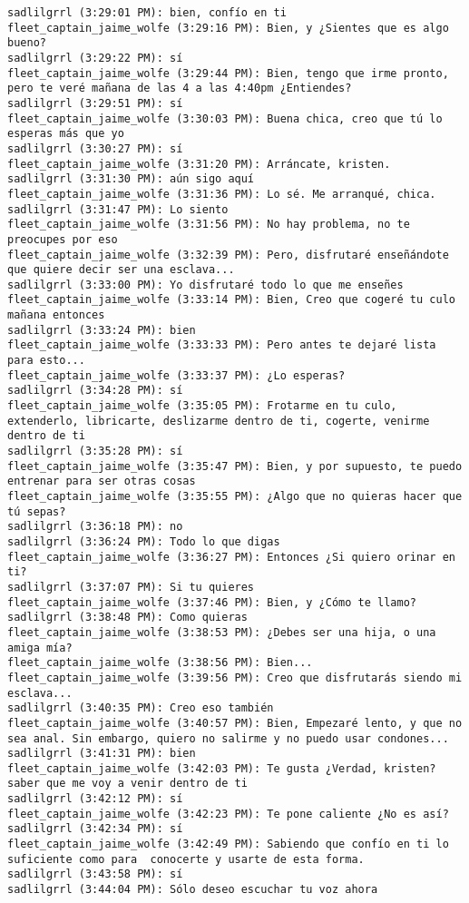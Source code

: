 \begin{verbatim}
sadlilgrrl (3:29:01 PM): bien, confío en ti
fleet_captain_jaime_wolfe (3:29:16 PM): Bien, y ¿Sientes que es algo bueno?
sadlilgrrl (3:29:22 PM): sí
fleet_captain_jaime_wolfe (3:29:44 PM): Bien, tengo que irme pronto, pero te veré mañana de las 4 a las 4:40pm ¿Entiendes?
sadlilgrrl (3:29:51 PM): sí
fleet_captain_jaime_wolfe (3:30:03 PM): Buena chica, creo que tú lo esperas más que yo
sadlilgrrl (3:30:27 PM): sí
fleet_captain_jaime_wolfe (3:31:20 PM): Arráncate, kristen.
sadlilgrrl (3:31:30 PM): aún sigo aquí
fleet_captain_jaime_wolfe (3:31:36 PM): Lo sé. Me arranqué, chica.
sadlilgrrl (3:31:47 PM): Lo siento
fleet_captain_jaime_wolfe (3:31:56 PM): No hay problema, no te preocupes por eso
fleet_captain_jaime_wolfe (3:32:39 PM): Pero, disfrutaré enseñándote que quiere decir ser una esclava...
sadlilgrrl (3:33:00 PM): Yo disfrutaré todo lo que me enseñes
fleet_captain_jaime_wolfe (3:33:14 PM): Bien, Creo que cogeré tu culo mañana entonces
sadlilgrrl (3:33:24 PM): bien
fleet_captain_jaime_wolfe (3:33:33 PM): Pero antes te dejaré lista para esto...
fleet_captain_jaime_wolfe (3:33:37 PM): ¿Lo esperas?
sadlilgrrl (3:34:28 PM): sí
fleet_captain_jaime_wolfe (3:35:05 PM): Frotarme en tu culo, extenderlo, libricarte, deslizarme dentro de ti, cogerte, venirme dentro de ti
sadlilgrrl (3:35:28 PM): sí
fleet_captain_jaime_wolfe (3:35:47 PM): Bien, y por supuesto, te puedo entrenar para ser otras cosas
fleet_captain_jaime_wolfe (3:35:55 PM): ¿Algo que no quieras hacer que tú sepas?
sadlilgrrl (3:36:18 PM): no
sadlilgrrl (3:36:24 PM): Todo lo que digas
fleet_captain_jaime_wolfe (3:36:27 PM): Entonces ¿Si quiero orinar en ti?
sadlilgrrl (3:37:07 PM): Si tu quieres
fleet_captain_jaime_wolfe (3:37:46 PM): Bien, y ¿Cómo te llamo? 
sadlilgrrl (3:38:48 PM): Como quieras
fleet_captain_jaime_wolfe (3:38:53 PM): ¿Debes ser una hija, o una amiga mía?
fleet_captain_jaime_wolfe (3:38:56 PM): Bien...
fleet_captain_jaime_wolfe (3:39:56 PM): Creo que disfrutarás siendo mi esclava...
sadlilgrrl (3:40:35 PM): Creo eso también
fleet_captain_jaime_wolfe (3:40:57 PM): Bien, Empezaré lento, y que no sea anal. Sin embargo, quiero no salirme y no puedo usar condones...
sadlilgrrl (3:41:31 PM): bien
fleet_captain_jaime_wolfe (3:42:03 PM): Te gusta ¿Verdad, kristen? saber que me voy a venir dentro de ti
sadlilgrrl (3:42:12 PM): sí
fleet_captain_jaime_wolfe (3:42:23 PM): Te pone caliente ¿No es así?
sadlilgrrl (3:42:34 PM): sí
fleet_captain_jaime_wolfe (3:42:49 PM): Sabiendo que confío en ti lo suficiente como para  conocerte y usarte de esta forma.
sadlilgrrl (3:43:58 PM): sí
sadlilgrrl (3:44:04 PM): Sólo deseo escuchar tu voz ahora

\end{verbatim}
